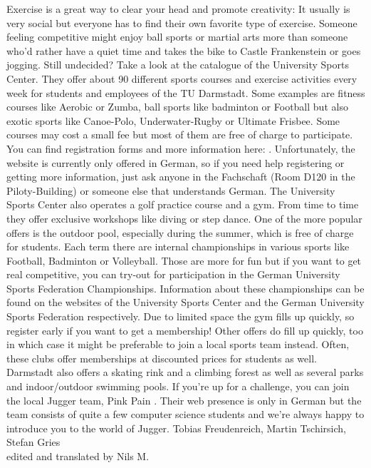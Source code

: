 {Exercise is a great way to clear your head and promote creativity: It usually is very social but everyone has to find their own favorite type of exercise.
}{
    Someone feeling competitive might enjoy ball sports or martial arts more than someone who'd rather have a quiet time and takes the bike to Castle Frankenstein or goes jogging.
    Still undecided? Take a look at the catalogue of the University Sports Center. They offer about 90 different sports courses and exercise activities every week for students and employees of the TU Darmstadt. Some examples are fitness courses like Aerobic or Zumba, ball sports like badminton or Football but also exotic sports like Canoe-Polo, Underwater-Rugby or Ultimate Frisbee.
    Some courses may cost a small fee but most of them are free of charge to participate. You can find registration forms and more information here: \footnotemark[1] . Unfortunately, the website is currently only offered in German, so if you need help registering or getting more information, just ask anyone in the Fachschaft (Room D120 in the Piloty-Building) or someone else that understands German. The University Sports Center also operates a golf practice course and a gym. From time to time they offer exclusive workshops like diving or step dance.
    One of the more popular offers is the outdoor pool, especially during the summer, which is free of charge for students.
    Each term there are internal championships in various sports like Football, Badminton or Volleyball. Those are more for fun but if you want to get real competitive, you can try-out for participation in the German University Sports Federation Championships. Information about these championships can be found on the websites of the University Sports Center \footnotemark[1] and the German University Sports Federation \footnotemark[2] respectively.
    Due to limited space the gym fills up quickly, so register early if you want to get a membership! Other offers do fill up quickly, too in which case it might be preferable to join a local sports team instead. Often, these clubs offer memberships at discounted prices for students as well.
    Darmstadt also offers a skating rink and a climbing forest as well as several parks and indoor/outdoor swimming pools.
    If you're up for a challenge, you can join the local Jugger team, Pink Pain \footnotemark[3] . Their web presence is only in German but the team consists of quite a few computer science students and we're always happy to introduce you to the world of Jugger.
}
{Tobias Freudenreich, Martin Tschirsich, Stefan Gries \\ edited and translated by Nils M.}

\newpage
